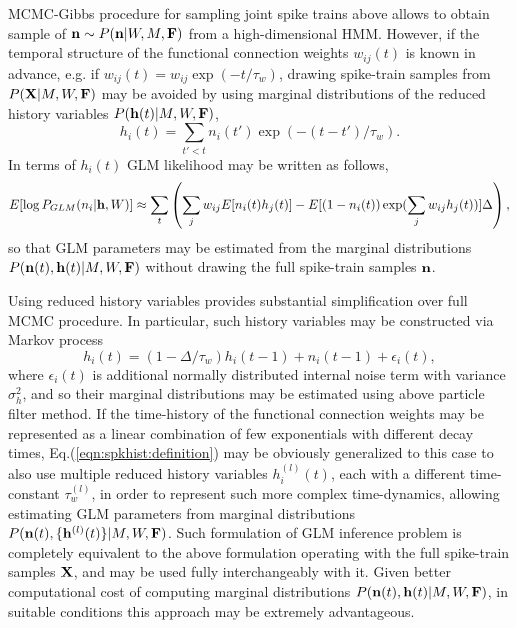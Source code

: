 \documentclass[amsmath,amssymb]{revtex4}
\begin{document}
MCMC-Gibbs procedure for sampling joint spike trains above allows to obtain sample of ${\bf n}\sim P({\bf n}|W,M,{\bf F})$ from a high-dimensional HMM. However, if the temporal structure of the functional connection weights $w_{ij}(t)$ is known in advance, e.g. if $w_{ij}(t)=w_{ij}\exp(-t/\tau_w)$, drawing spike-train samples from $P({\bf X}|M,W,{\bf F})$ may be avoided by using marginal distributions of the reduced history variables $P({\bf h}(t)|M,W,{\bf F})$,
\begin{equation}
h_i(t)=\sum\limits_{t'<t} n_i(t')\exp(-(t-t')/\tau_w).
\end{equation}
In terms of $h_i(t)$ GLM likelihood may be written as follows,
\begin{equation}
E[\log P_{GLM}(n_i|{\bf h},W)]\approx \sum_t \left(\sum\limits_{j} w_{ij} E[n_i(t) h_j(t)] -
E[(1-n_i(t)) \exp(\sum\limits_j w_{ij}h_j(t))] \Delta \right),
\end{equation}
so that GLM parameters may be estimated from the marginal distributions $P({\bf n}(t),{\bf h}(t)|M,W,{\bf F})$ without drawing the full spike-train samples ${\bf n}$.

Using reduced history variables provides substantial simplification over full MCMC procedure. In particular, such history variables may be constructed via Markov process
\begin{equation}\label{eqn:spkhist:definition}
h_i(t)=(1-\Delta/\tau_w) h_i(t-1) + n_i(t-1) + \epsilon_i(t),
\end{equation}
where $\epsilon_i(t)$ is additional normally distributed internal noise term with variance $\sigma^2_h$, and so their marginal distributions may be estimated using above particle filter method. If the time-history of the  functional connection weights may be represented as a linear combination of few exponentials with different decay times, Eq.(\ref{eqn:spkhist:definition}) may be obviously generalized to this case to also use multiple reduced history variables $h_i^{(l)}(t)$, each with a different time-constant $\tau^{(l)}_w$, in order to represent such more complex time-dynamics, allowing estimating GLM parameters from marginal distributions $P({\bf n}(t),\{{\bf h}^{(l)}(t)\}|M,W,{\bf F})$.
Such formulation of GLM inference problem is completely equivalent to the above formulation operating with the full spike-train samples ${\bf X}$, and may be used fully interchangeably with it. Given better computational cost of computing marginal distributions $P({\bf n}(t),{\bf h}(t)|M,W,{\bf F})$, in suitable conditions this approach may be extremely advantageous.
\end{document}
